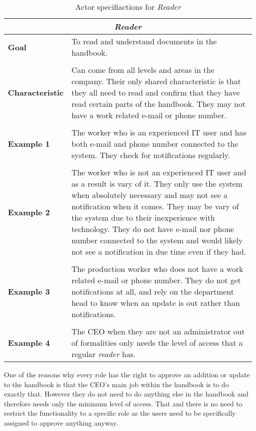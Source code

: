 \begin{table}[H]
	\begin{tabular}{l m{11.3cm}}
		\hline
		\multicolumn{2}{c}{\textbf{\textit{Reader}}}\\
		\hline
		
		\textbf{Goal} & To read and understand documents in the handbook. \\
		&  \\
		
		\textbf{Characteristic} & Can come from all levels and areas in the company.
		Their only shared characteristic is that they all need to read and confirm that they have read certain parts of the handbook.
		They may not have a work related e-mail or phone number.\\
		&  \\
		
		\textbf{Example 1}
		& The worker who is an experienced IT user and has both e-mail and phone number connected to the system.
		They check for notifications regularly.\\
		&  \\
		\textbf{Example 2}
		& The worker who is not an experienced IT user and as a result is vary of it. 
		They only use the system when absolutely necessary and may not see a notification when it comes.
		They may be vary of the system due to their inexperience with technology.
		They do not have e-mail nor phone number connected to the system and would likely not see a notification in due time even if they had.\\
		&  \\
		
		\textbf{Example 3}
		& The production worker who does not have a work related e-mail or phone number. They do not get notifications at all, and rely on the department head to know when an update is out rather than notifications.\\
		&  \\
		
		\textbf{Example 4}
		& The CEO when they are not an administrator out of formalities only needs the level of access that a regular \textit{reader} has.\\		
		
		\hline
	\end{tabular}
	\caption{Actor specifiactions for \textit{Reader}}\label{tab:Actor-read}
\end{table}

One of the reasons why every role has the right to approve an addition or update to the handbook is that the CEO's main job within the handbook is to do exactly that.
However they do not need to do anything else in the handbook and therefore needs only the minimum level of access.
That and there is no need to restrict the functionality to a specific role as the users need to be specifically assigned to approve anything anyway.